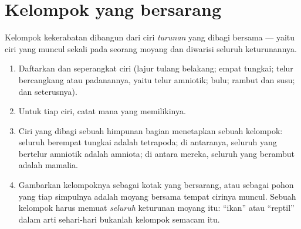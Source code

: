 \section{Kelompok yang bersarang}

\begin{method}\label{met:g10:common-ancestry:grouping}
Kelompok kekerabatan dibangun dari ciri \emph{turunan} yang dibagi
bersama --- yaitu ciri yang muncul sekali pada seorang moyang dan
diwarisi seluruh keturunannya.
\begin{enumerate}
  \item Daftarkan  dan seperangkat ciri (lajur tulang
        belakang; empat tungkai; telur bercangkang atau padanannya,
        yaitu telur amniotik; bulu; rambut dan susu; dan seterusnya).
  \item Untuk tiap ciri, catat  mana yang memilikinya.
  \item Ciri yang dibagi sebuah himpunan bagian menetapkan sebuah
        kelompok: seluruh  berempat tungkai adalah tetrapoda; di
        antaranya, seluruh yang bertelur amniotik adalah amniota; di
        antara mereka, seluruh yang berambut adalah mamalia.
  \item Gambarkan kelompoknya sebagai kotak yang bersarang, atau
        sebagai pohon yang tiap simpulnya adalah moyang bersama tempat
        cirinya muncul. Sebuah kelompok harus memuat \emph{seluruh}
        keturunan moyang itu: ``ikan'' atau ``reptil'' dalam arti
        sehari-hari bukanlah kelompok semacam itu.
\end{enumerate}
\end{method}

